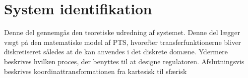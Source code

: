 \part{System identifikation}
Denne del gennemgås den teoretiske udredning af systemet. Denne del lægger vægt på den matematiske model af PTS, hvorefter transferfunktionerne bliver diskretiseret således at de kan anvendes i det diskrete domæne. Ydermere beskrives hvilken proces, der benyttes til at designe regulatoren.
Afslutningsvis beskrives koordinattransformationen fra kartesisk til sfærisk




